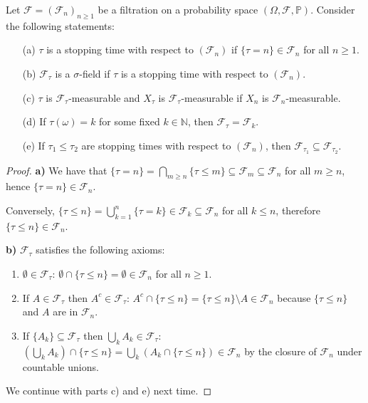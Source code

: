 \begin{lemma}
Let $\mathcal{F} = (\mathcal{F}_n)_{n\geq 1}$ be a filtration on a probability space $(\Omega, \mathcal{F}, \mathbb{P})$. Consider the following statements:
\begin{itemize}
    \item[(a)] $\tau$ is a stopping time with respect to $(\mathcal{F}_n)$ if $\{\tau = n\} \in \mathcal{F}_n$ for all $n \geq 1$.
    \item[(b)] $\mathcal{F}_\tau$ is a $\sigma$-field if $\tau$ is a stopping time with respect to $(\mathcal{F}_n)$.
    \item[(c)] $\tau$ is $\mathcal{F}_\tau$-measurable and $X_\tau$ is $\mathcal{F}_\tau$-measurable if $X_n$ is $\mathcal{F}_n$-measurable.
    \item[(d)] If $\tau(\omega) = k$ for some fixed $k \in \mathbb{N}$, then $\mathcal{F}_\tau = \mathcal{F}_k$.
    \item[(e)] If $\tau_1 \leq \tau_2$ are stopping times with respect to $(\mathcal{F}_n)$, then $\mathcal{F}_{\tau_1} \subseteq \mathcal{F}_{\tau_2}$.
\end{itemize}
\end{lemma}

\begin{proof}
\textbf{a)} We have that $\{\tau = n\} = \bigcap_{m \geq n} \{\tau \leq m\} \subseteq \mathcal{F}_m \subseteq \mathcal{F}_n$ for all $m \geq n$, hence $\{\tau = n\} \in \mathcal{F}_n$.

Conversely, $\{\tau \leq n\} = \bigcup_{k=1}^{n} \{\tau = k\} \in \mathcal{F}_k \subseteq \mathcal{F}_n$ for all $k \leq n$, therefore $\{\tau \leq n\} \in \mathcal{F}_n$.

\textbf{b)} $\mathcal{F}_\tau$ satisfies the following axioms:
\begin{enumerate}
    \item $\emptyset \in \mathcal{F}_\tau$: $\emptyset \cap \{\tau \leq n\} = \emptyset \in \mathcal{F}_n$ for all $n \geq 1$.
    \item If $A \in \mathcal{F}_\tau$ then $A^c \in \mathcal{F}_\tau$: $A^c \cap \{\tau \leq n\} = \{\tau \leq n\} \setminus A \in \mathcal{F}_n$ because $\{\tau \leq n\}$ and $A$ are in $\mathcal{F}_n$.
    \item If $\{A_k\} \subseteq \mathcal{F}_\tau$ then $\bigcup_{k} A_k \in \mathcal{F}_\tau$: $\left(\bigcup_{k} A_k\right) \cap \{\tau \leq n\} = \bigcup_{k} (A_k \cap \{\tau \leq n\}) \in \mathcal{F}_n$ by the closure of $\mathcal{F}_n$ under countable unions.
\end{enumerate}
We continue with parts c) and e) next time.
\end{proof}
